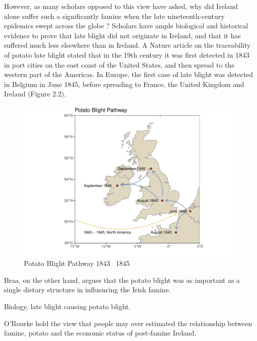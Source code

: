However, as many scholars opposed to this view have asked, why did Ireland alone suffer such a significantly famine when the late nineteenth-century epidemics swept across the globe \citep{oleksy46irish, mokyr2013ireland, solar2015ireland, kelly2015ireland, gray2006famine}? Scholars have ample biological and historical evidence to prove that late blight did not originate in Ireland, and that it has suffered much less elsewhere than in Ireland. A Nature article \citep{bourke1964emergence} on the traceability of potato late blight stated that in the 19th century it was first detected in 1843 in port cities on the east coast of the United States, and then spread to the western part of the Americas. In Europe, the first case of late blight was detected in Belgium in June 1845, before spreading to France, the United Kingdom and Ireland (Figure 2.2).

\begin{figure}[htbp]
    \centering
    \caption{Potato Blight Pathway 1843 \textendash\ 1845}
    \includegraphics[width=.95\textwidth]{../03_outputs/blight_pathway.pdf}
\end{figure}

Braa, on the other hand, argues that the potato blight was as important as a single dietary structure in influencing the Irish famine.\citep{braa1997great}


Biology, late blight causing potato blight.

O'Rourke hold the view that people may over estimated the relationship between famine, potato and the economic status of post-famine Ireland\citep{o1994economic}.





